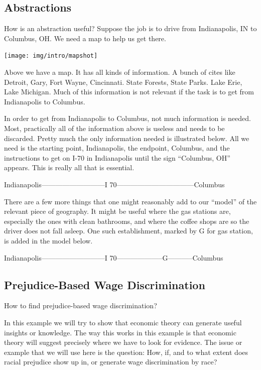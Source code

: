 \documentclass[
]{book}
\begin{document}
\hypertarget{abstractions}{%
\subsection{Abstractions}\label{abstractions}}

How is an abstraction useful? Suppose the job is to drive from Indianapolis, IN to Columbus, OH. We need a map to help us get there.

\texttt{[image: img/intro/mapshot]}

Above we have a map. It has all kinds of information. A bunch of cites like Detroit, Gary, Fort Wayne, Cincinnati. State Forests, State Parks. Lake Erie, Lake Michigan. Much of this information is not relevant if the task is to get from Indianapolis to Columbus.

In order to get from Indianapolis to Columbus, not much information is needed. Most, practically all of the information above is useless and needs to be discarded. Pretty much the only information needed is illustrated below. All we need is the starting point, Indianapolis, the endpoint, Columbus, and the instructions to get on I-70 in Indianapolis until the sign ``Columbus, OH'' appears. This is really all that is essential.

Indianapolis---------------------------I 70---------------------------------Columbus

There are a few more things that one might reasonably add to our ``model'' of the relevant piece of geography. It might be useful where the gas stations are, especially the ones with clean bathrooms, and where the coffee shops are so the driver does not fall asleep. One such establishment, marked by G for gas station, is added in the model below.

Indianapolis---------------------------I 70--------------------G-----------Columbus

\hypertarget{prejudice-based-wage-discrimination}{%
\subsection{Prejudice-Based Wage Discrimination}\label{prejudice-based-wage-discrimination}}

How to find prejudice-based wage discrimination?

In this example we will try to show that economic theory can generate useful insights or knowledge. The way this works in this example is that economic theory will suggest precisely where we have to look for evidence. The issue or example that we will use here is the question:
How, if, and to what extent does racial prejudice show up in, or generate wage discrimination by race?
\end{document}
